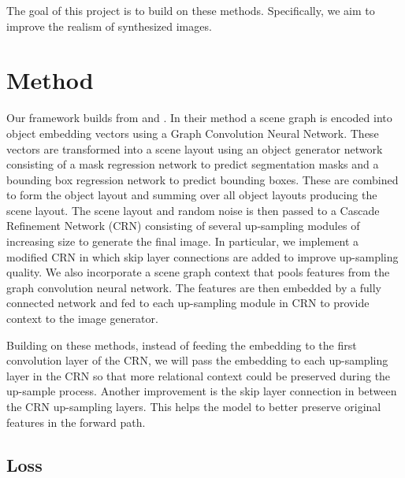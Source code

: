 \documentclass{article}
\begin{document}
The goal of this project is to build on these methods. Specifically, we aim to improve the realism of synthesized images.

\section{Method}

Our framework builds from \cite{sg2im} and \cite{sg2imgcontext}. In their method a scene graph is encoded into object embedding vectors using a Graph Convolution Neural Network. These vectors are transformed into a scene layout using an object generator network consisting of a mask regression network to predict segmentation masks and a bounding box regression network to predict bounding boxes. These are combined to form the object layout and summing over all object layouts producing the scene layout. The scene layout and random noise is then passed to a Cascade Refinement Network (CRN) \cite{crn} consisting of several up-sampling modules of increasing size to generate the final image. In particular, we implement a modified CRN in which skip layer connections are added to improve up-sampling quality. We also incorporate a scene graph context \cite{sg2imgcontext} that pools features from the graph convolution neural network. The features are then embedded by a fully connected network and fed to each up-sampling module in CRN to provide context to the image generator.

Building on these methods, instead of feeding the embedding to the first convolution layer of the CRN, we will pass the embedding to each up-sampling layer in the CRN so that more relational context could be preserved during the up-sample process. Another improvement is the skip layer connection in between the CRN up-sampling layers. This helps the model to better preserve original features in the forward path.

\subsection{Loss}
\end{document}
